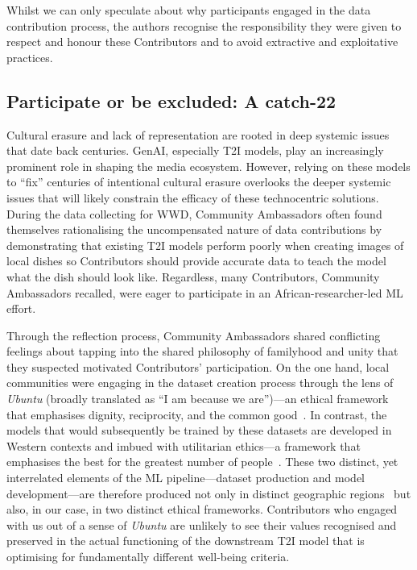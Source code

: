 Whilst we can only speculate about why participants engaged in the data contribution process, the authors recognise the responsibility they were given to respect and honour these Contributors and to avoid extractive and exploitative practices. 

\subsection{Participate or be excluded: A catch-22}


Cultural erasure and lack of representation are rooted in deep systemic issues that date back centuries. GenAI, especially T2I models, play an increasingly prominent role in shaping the media ecosystem. However, relying on these models to ``fix'' centuries of intentional cultural erasure overlooks the deeper systemic issues that will likely constrain the efficacy of these technocentric solutions. During the data collecting for \textsc{WWD}, Community Ambassadors often found themselves rationalising the uncompensated nature of data contributions by demonstrating that existing T2I models perform poorly when creating images of local dishes so Contributors should provide accurate data to teach the model what the dish should look like. Regardless, many Contributors, Community Ambassadors recalled, were eager to participate in an African-researcher-led ML effort. 

Through the reflection process, Community Ambassadors shared conflicting feelings about tapping into the shared philosophy of familyhood and unity that they suspected motivated Contributors' participation. On the one hand, local communities were engaging in the dataset creation process through the lens of \textit{Ubuntu} (broadly translated as ``I am because we are'')---an ethical framework that emphasises dignity, reciprocity, and the common good~\cite{ewuoso2019core}. In contrast, the models that would subsequently be trained by these datasets are developed in Western contexts and imbued with utilitarian ethics---a framework that emphasises the best for the greatest number of people~\cite{selbstFairnessAbstractionSociotechnical2019,west2004introduction}. These two distinct, yet interrelated elements of the ML pipeline---dataset production and model development---are therefore produced not only in distinct geographic regions~\cite{sambasivan2021everyone,scheuermanDatasetsHavePolitics2021} but also, in our case, in two distinct ethical frameworks. Contributors who engaged with us out of a sense of \textit{Ubuntu} are unlikely to see their values recognised and preserved in the actual functioning of the downstream T2I model that is optimising for fundamentally different well-being criteria.  


